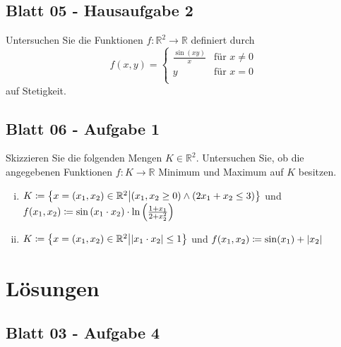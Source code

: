 \documentclass{scrreprt}
\begin{document}
\section{Blatt 05 - Hausaufgabe 2}

Untersuchen Sie die Funktionen $f \colon \mathbb{R}^2 \to \mathbb{R}$ definiert
durch
\[
  f(x, y) = \begin{cases}
    \frac{\sin(xy)}{x} & \text{für } x \ne 0 \\
    y & \text{für } x = 0 \\
  \end{cases}
\]
auf Stetigkeit.

\section{Blatt 06 - Aufgabe 1}

Skizzieren Sie die folgenden Mengen $K \in \mathbb{R}^2$.
Untersuchen Sie, ob die angegebenen Funktionen $f: K \to \mathbb{R}$
Minimum und Maximum auf $K$ besitzen.
\begin{enumerate}[(i)]
\item $K \coloneqq \qty{x = \qty(x_1, x_2) \in \mathbb{R}^2 \middle|
    (x_1, x_2 \geq 0) \land (2x_1 + x_2 \leq 3)}$ und
  $f\qty(x_1, x_2) \coloneqq \sin\qty(x_1 \cdot x_2) \cdot
  \ln\qty(\frac{1 + x_1}{2 + x_2^2})$

\item $K \coloneqq \qty{x = \qty(x_1, x_2) \in \mathbb{R}^2 \middle|
    \abs{x_1 \cdot x_2} \leq 1}$ und
  $f\qty(x_1, x_2) \coloneqq \sin(x_1) + \abs{x_2}$
\end{enumerate}

\chapter{Lösungen}

\section{Blatt 03 - Aufgabe 4}
\end{document}
